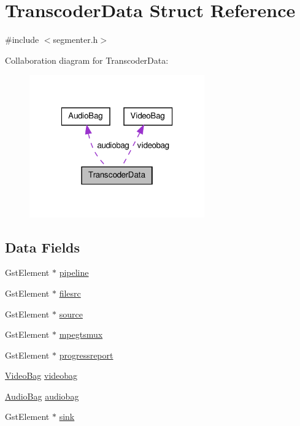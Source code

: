 \hypertarget{struct_transcoder_data}{\section{\-Transcoder\-Data \-Struct \-Reference}
\label{struct_transcoder_data}
}


{\ttfamily \#include $<$segmenter.\-h$>$}



\-Collaboration diagram for \-Transcoder\-Data\-:\nopagebreak
\begin{figure}[H]
\begin{center}
\leavevmode
\includegraphics[width=214pt]{struct_transcoder_data__coll__graph}
\end{center}
\end{figure}
\subsection*{\-Data \-Fields}
\begin{DoxyCompactItemize}
\item 
\-Gst\-Element $\ast$ \hyperlink{struct_transcoder_data_a310ff227733a8a01cb68a9af5e132751}{pipeline}
\item 
\-Gst\-Element $\ast$ \hyperlink{struct_transcoder_data_a650b27f093557fcea9f53f432c7724cf}{filesrc}
\item 
\-Gst\-Element $\ast$ \hyperlink{struct_transcoder_data_a258d0be8d8f4992e7579e31c12e06078}{source}
\item 
\-Gst\-Element $\ast$ \hyperlink{struct_transcoder_data_aa67a91cfc1bc02fc307178ef4f35df14}{mpegtsmux}
\item 
\-Gst\-Element $\ast$ \hyperlink{struct_transcoder_data_a1c5791a8cd24df307c8937e96e165d60}{progressreport}
\item 
\hyperlink{struct_video_bag}{\-Video\-Bag} \hyperlink{struct_transcoder_data_aceb5b4e8609bbec3bf57e52a7f4d865a}{videobag}
\item 
\hyperlink{struct_audio_bag}{\-Audio\-Bag} \hyperlink{struct_transcoder_data_a27c753df9dd609802e4649f4be7e64e7}{audiobag}
\item 
\-Gst\-Element $\ast$ \hyperlink{struct_transcoder_data_a92b8e1a70279c8c57514246bcea2a6c0}{sink}
\end{DoxyCompactItemize}


